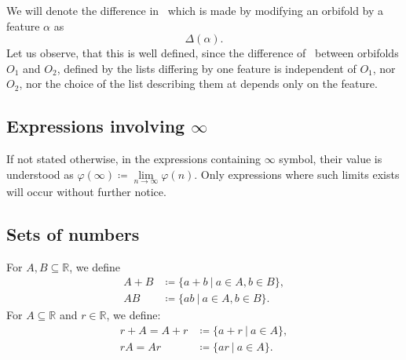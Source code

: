 We will denote the difference in \Eoc\ which is made by modifying 
an orbifold by a feature $\alpha$ as 
\begin{equation}
\Delta(\alpha).
\end{equation}
Let us observe, that this is well defined, since the difference of \Eoc\ between orbifolds 
$O_1$ and $O_2$, defined by the lists differing by one feature is independent of 
$O_1$, nor $O_2$, nor the choice of the list describing them at depends only on the feature.


\subsection{Expressions involving $\infty$}
If not stated otherwise, in the expressions containing $\infty$ symbol, their value is understood 
as $\varphi(\infty) \coloneqq \lim\limits_{n\to \infty}\varphi(n)$. Only expressions 
where such limits exists will occur without further notice.

\subsection{Sets of numbers}
For $A, B \subseteq \mathbb{R}$, we define 
\begin{align}
A+B &\coloneqq \{a+b\ |\ a \in A, b\in B\}, \\
AB &\coloneqq \{ab\ |\ a \in A, b\in B\}.
\end{align}
For $A \subseteq \mathbb{R}$ and $r \in \mathbb{R}$, we define:
\begin{align}
r + A = A + r &\coloneqq \{a+r\ |\ a \in A\}, \\
rA = Ar &\coloneqq  \{ar\ |\ a \in A\}.
\end{align}

